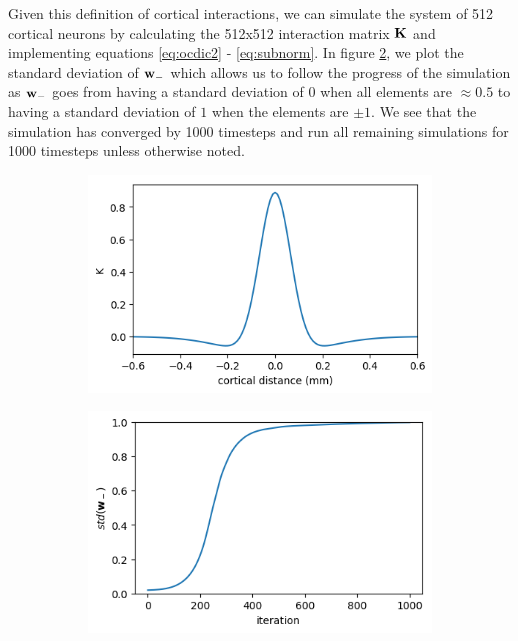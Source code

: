 \documentclass{article}
\begin{document}
Given this definition of cortical interactions, we can simulate the system of 512 cortical neurons by calculating the 512x512 interaction matrix $\bf K$ and implementing equations \ref{eq:ocdic2} - \ref{eq:subnorm}. In figure \ref{fig:stds}, we plot the standard deviation of ${\bf w}_-$ which allows us to follow the progress of the simulation as ${\bf w}_-$ goes from having a standard deviation of $0$ when all elements are $\approx 0.5$ to having a standard deviation of $1$ when the elements are $\pm 1$. We see that the simulation has converged by 1000 timesteps and run all remaining simulations for 1000 timesteps unless otherwise noted.

\begin{figure}[h]
	\centering
	\begin{subfigure}[t]{0.45\linewidth}
		\centering
		\includegraphics[width = 1.0\linewidth, trim={0 0 0 0}, clip=true]{figures/plot_K.png}
		\label{fig:plotK}	
	\end{subfigure}%
	\hspace{0.05\linewidth}
	\begin{subfigure}[t]{0.45\linewidth}
		\centering
		\includegraphics[width = 1.0\linewidth, trim={0 0 0 0}, clip=true]{figures/occsimtemp_stds.png}
		\label{fig:stds}	
	\end{subfigure}%
\caption{}
\label{}
\end{figure}
\end{document}
